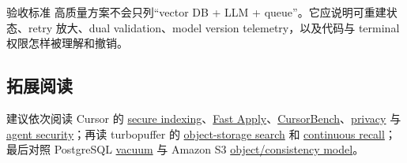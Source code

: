 \begin{knowledgebox}{验收标准}
高质量方案不会只列“vector DB + LLM + queue”。它应说明可重建状态、retry 放大、dual validation、model version telemetry，以及代码与 terminal 权限怎样被理解和撤销。
\end{knowledgebox}

\subsection{拓展阅读}

建议依次阅读 Cursor 的 \href{https://cursor.com/blog/secure-codebase-indexing}{secure indexing}、\href{https://cursor.com/blog/instant-apply}{Fast Apply}、\href{https://cursor.com/blog/cursorbench}{CursorBench}、\href{https://cursor.com/docs/enterprise/privacy-and-data-governance}{privacy} 与 \href{https://cursor.com/docs/agent/security}{agent security}；再读 turbopuffer 的 \href{https://turbopuffer.com/blog/turbopuffer}{object-storage search} 和 \href{https://turbopuffer.com/blog/continuous-recall}{continuous recall}；最后对照 PostgreSQL \href{https://www.postgresql.org/docs/current/routine-vacuuming.html}{vacuum} 与 Amazon S3 \href{https://docs.aws.amazon.com/AmazonS3/latest/userguide/Welcome.html}{object/consistency model}。


